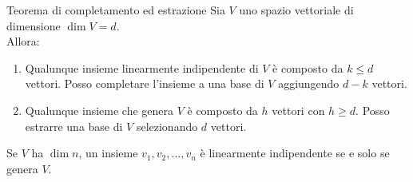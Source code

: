 \documentclass[a4paper]{article}
\theoremstyle{definition}
\begin{document}
\begin{teo}{Teorema di completamento ed estrazione}{}
	Sia $V$ uno spazio vettoriale di dimensione $\dim V = d$. \\
	Allora:
	\begin{enumerate}
		\item Qualunque insieme linearmente indipendente di $V$ è composto da $k \leq d$ vettori.
		    Posso completare l'insieme a una base di $V$ aggiungendo $d - k$ vettori.
		\item Qualunque insieme che genera $V$ è composto da $h$ vettori con $h \geq d$.
		    Posso estrarre una base di $V$ selezionando $d$ vettori.
	\end{enumerate}
\end{teo}

\begin{cor}{}{}
	Se $V$ ha $\dim n$, un insieme $v_1, v_2, ..., v_n$ è linearmente indipendente se e solo se genera $V$.
\end{cor}
\end{document}
